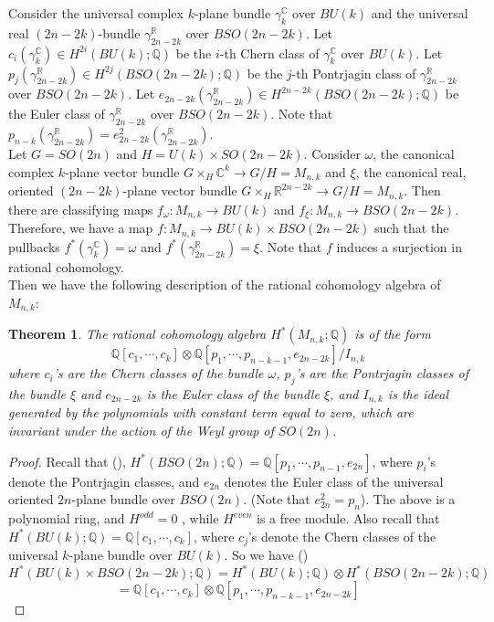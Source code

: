 \documentclass[a4paper,leqno,12pt]{amsart}
\theoremstyle{plain}
\newtheorem{thm}{Theorem}[section]
\theoremstyle{definition}
\theoremstyle{remark}
\newcommand{\R}{\mathbb{R}}
\newcommand{\Q}{\mathbb{Q}}
\newcommand{\C}{\mathbb{C}}
\begin{document}
{\noindent
Consider the universal complex $k$-plane bundle $\gamma_{k}^{\C}$ over $BU(k)$ and the universal real $(2n-2k)$-bundle $\gamma_{2n-2k}^{\R}$ over $BSO(2n-2k)$.  Let $ c_{i} (\gamma_{k}^{\C}) \in H^{2i} (BU(k) ; \Q)$ be the $i$-th Chern class of $\gamma_{k}^{\C}$ over $BU(k)$.  Let $ p_{j} (\gamma_{2n-2k}^{\R}) \in H^{2j} (BSO(2n-2k) ; \Q)$ be the $j$-th Pontrjagin class of $\gamma_{2n-2k}^{\R}$ over $BSO(2n-2k)$. Let $e_{2n-2k} (\gamma_{2n-2k}^{\R}) \in H^{2n-2k}(BSO(2n-2k) ; \Q)$ be the Euler class of $\gamma_{2n-2k}^{\R}$ over $BSO(2n-2k)$.  Note that $p_{n-k} (\gamma_{2n-2k}^{\R}) = e_{2n-2k}^{2} (\gamma_{2n-2k}^{\R})$. \\

\noindent
Let $G = SO(2n)$  and $H = U(k) \times SO(2n-2k)$.  Consider  $\omega$,  the canonical complex $k$-plane vector bundle $G \times_{H} \C^{k} \longrightarrow G/H = M_{n,k}$ and $\xi$,  the canonical real,  oriented $(2n-2k)$-plane vector bundle $G \times_{H} \R^{2n-2k} \longrightarrow G/H = M_{n,k}$.  Then there are classifying maps $f_{\omega} \colon M_{n,k} \longrightarrow BU(k)$ and $f_{\xi} \colon M_{n,k} \longrightarrow BSO(2n-2k)$.  Therefore,  we have a map $f \colon M_{n,k} \longrightarrow BU(k) \times BSO(2n-2k)$ such that the pullbacks $f^{*} (\gamma_{k}^{\C}) = \omega$ and $f^{*} (\gamma_{2n-2k}^{\R}) = \xi$.  Note that $f$ induces a surjection in rational cohomology.  \\

\noindent
Then we have the following description of the rational cohomology algebra of $M_{n,k}$:
\begin{thm} \label{thm31}
The rational cohomology algebra  $H^{*}(M_{n,k} ; \Q)$ is of the form $$\Q[c_1 , \cdots , c_k] \otimes \Q[p_1,  \cdots , p_{n-k-1},  e_{2n-2k}]/ I_{n,k} $$ where $c_{i}$'s are the Chern classes of the bundle $\omega$,  $p_j$'s are the Pontrjagin classes of the bundle $\xi$ and $e_{2n-2k}$ is the Euler class of the bundle $\xi$,  and $I_{n,k}$ is the ideal generated by the polynomials with constant term equal to zero,  which are invariant under the action of the Weyl group of $SO(2n)$. 
\end{thm}

\begin{proof}
\noindent
Recall that (\cite{MMT}),   $H^{*}(BSO(2n); \Q) =  \Q[p_{1},  \cdots ,  p_{n-1},  e_{2n}]$,  where $p_{i}$'s denote the  Pontrjagin classes,  and $e_{2n}$ denotes the Euler class of the universal oriented $2n$-plane bundle over $BSO(2n)$.  (Note that $e_{2n}^{2} = p_{n}$).  The above is a polynomial ring,  and $H^{odd} = 0 $ ,  while $H^{even}$ is a free  module.  
Also recall that  $H^{*}(BU(k); \Q) =  \Q[c_{1},  \cdots ,  c_{k}]$,  where $c_{j}$'s denote the Chern classes of the universal $k$-plane bundle over $BU(k)$.  So we have (\cite{MMT}) 
\begin{displaymath}
H^{*}(BU(k) \times BSO(2n-2k) ; \Q) = H^{*}(BU(k); \Q) \otimes H^{*}( BSO(2n-2k) ; \Q) 
\end{displaymath}
 \begin{displaymath}
= \Q[c_{1}, \cdots, c_{k}] \otimes \Q[p_{1},  \cdots,  p_{n-k-1},  e_{2n-2k}]
\end{displaymath}


\end{proof}}
\end{document}
